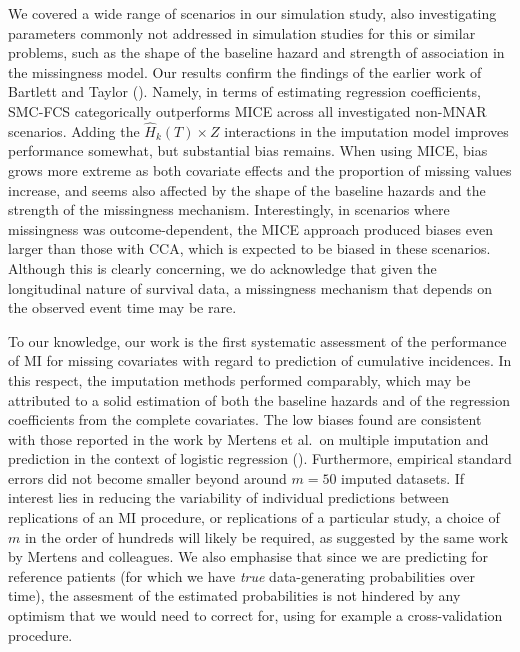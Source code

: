 \documentclass[
  letterpaper,
  paper=240mm:170mm,
  twoside=true,
  open=right,
  fontsize=10pt,
  pagesize=false,
  BCOR=15mm,
  DIV=14,
  headinclude=true,
  footinclude=false,
  headsepline=on]{scrbook}
\begin{document}
We covered a wide range of scenarios in our simulation study, also
investigating parameters commonly not addressed in simulation studies
for this or similar problems, such as the shape of the baseline hazard
and strength of association in the missingness model. Our results
confirm the findings of the earlier work of Bartlett and Taylor
(). Namely,
in terms of estimating regression coefficients, SMC-FCS categorically
outperforms MICE across all investigated non-MNAR scenarios. Adding the
\(\hat{H}_{k}(T) \times Z\) interactions in the imputation model
improves performance somewhat, but substantial bias remains. When using
MICE, bias grows more extreme as both covariate effects and the
proportion of missing values increase, and seems also affected by the
shape of the baseline hazards and the strength of the missingness
mechanism. Interestingly, in scenarios where missingness was
outcome-dependent, the MICE approach produced biases even larger than
those with CCA, which is expected to be biased in these scenarios.
Although this is clearly concerning, we do acknowledge that given the
longitudinal nature of survival data, a missingness mechanism that
depends on the observed event time may be rare.

To our knowledge, our work is the first systematic assessment of the
performance of MI for missing covariates with regard to prediction of
cumulative incidences. In this respect, the imputation methods performed
comparably, which may be attributed to a solid estimation of both the
baseline hazards and of the regression coefficients from the complete
covariates. The low biases found are consistent with those reported in
the work by Mertens et al.~on multiple imputation and prediction in the
context of logistic regression
(). Furthermore, empirical standard errors did not
become smaller beyond around \(m = 50\) imputed datasets. If interest
lies in reducing the variability of individual predictions between
replications of an MI procedure, or replications of a particular study,
a choice of \(m\) in the order of hundreds will likely be required, as
suggested by the same work by Mertens and colleagues. We also emphasise
that since we are predicting for reference patients (for which we have
\emph{true} data-generating probabilities over time), the assesment of
the estimated probabilities is not hindered by any optimism that we
would need to correct for, using for example a cross-validation
procedure.
\end{document}
